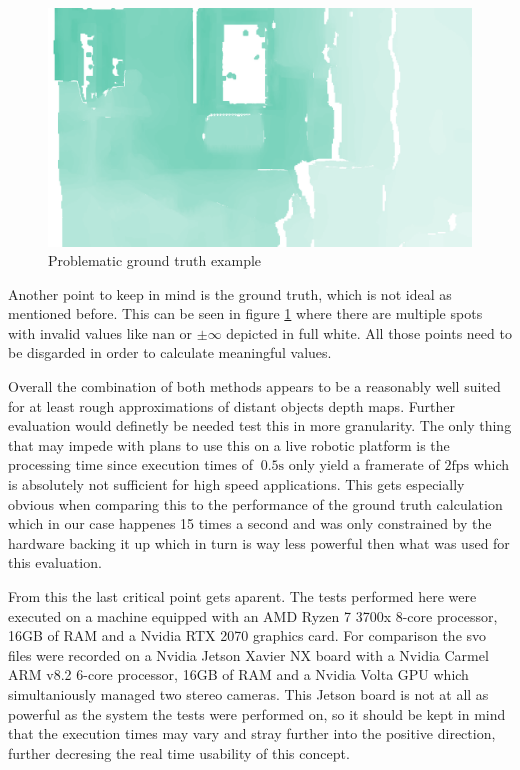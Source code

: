 \begin{figure}[ht!]
    \begin{center}
        \includegraphics*[scale=.22, pagebox=artbox]{resources/example_depth.png}
        \caption{Problematic ground truth example} \label{example_depth}
    \end{center}
\end{figure}

Another point to keep in mind is the ground truth, which is not ideal as mentioned before. This can be seen in figure \ref*{example_depth} where there are multiple spots with invalid values like $\mathrm{nan}$ or $\pm\infty$ depicted in full white. All those points need to be disgarded in order to calculate meaningful values.

Overall the combination of both methods appears to be a reasonably well suited for at least rough approximations of distant objects depth maps. Further evaluation would definetly be needed test this in more granularity. The only thing that may impede with plans to use this on a live robotic platform is the processing time since execution times of $~0.5\mathrm{s}$ only yield a framerate of $2\mathrm{fps}$ which is absolutely not sufficient for high speed applications. This gets especially obvious when comparing this to the performance of the ground truth calculation which in our case happenes 15 times a second and was only constrained by the hardware backing it up which in turn is way less powerful then what was used for this evaluation.

From this the last critical point gets aparent. The tests performed here were executed on a machine equipped with an AMD Ryzen 7 3700x 8-core processor, 16GB of RAM and a Nvidia RTX 2070 graphics card. For comparison the svo files were recorded on a Nvidia Jetson Xavier NX board with a Nvidia Carmel ARM v8.2 6-core processor, 16GB of RAM and a Nvidia Volta GPU which simultaniously managed two stereo cameras. This Jetson board is not at all as powerful as the system the tests were performed on, so it should be kept in mind that the execution times may vary and stray further into the positive direction, further decresing the real time usability of this concept.